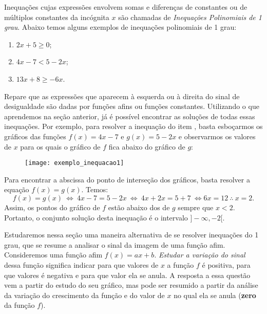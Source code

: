 \label{\detokenize{AF107-7:inequacoes-grau1}}\label{\detokenize{AF107-7::doc}}

Inequações cujas expressões envolvem somas e diferenças de constantes ou de múltiplos constantes da incógnita $x$ são chamadas de \emph{Inequações Polinomiais de 1 grau}. Abaixo temos alguns exemplos de inequações polinomiais de 1 grau:

\begin{enumerate}
\item{}
$2x + 5 \geq 0$;

\item{}
$4x - 7 < 5 - 2x$;

\item{}
$13x + 8 \geq -6x$.
\end{enumerate}

Repare que as expressões que aparecem à esquerda ou à direita do sinal de desigualdade são dadas por funções afins ou funções constantes. Utilizando o que aprendemos na seção anterior, já é possível encontrar as soluções de todas essas inequações. Por exemplo, para resolver a inequação do item , basta esboçarmos os gráficos das funções $f(x) = 4x -7$ e $g(x) = 5 - 2x$ e observarmos os valores de $x$ para os quais o gráfico de $f$ fica abaixo do gráfico de $g$:

\begin{figure}[H]
\centering
\noindent\texttt{[image: exemplo\_inequacao1]}
\end{figure}

Para encontrar a abscissa do ponto de interseção dos gráficos, basta resolver a equação $f(x) = g(x)$. Temos:
$$
f(x) = g(x) \ \iff \ 4x - 7 = 5 - 2x \ \iff \ 4x +2x = 5 +7 \ \iff 6x = 12 \ \therefore \ x = 2.
$$
Assim, os pontos do gráfico de $f$ estão abaixo dos de $g$ sempre que $x<2$. Portanto, o conjunto solução desta inequação é o intervalo $]-\infty, -2[$.

Estudaremos nessa seção uma maneira alternativa de se resolver inequações do 1 grau, que se resume a analisar o sinal da imagem de uma função afim. Consideremos uma função afim $f(x) = ax + b$. \emph{Estudar a variação do sinal} dessa função significa indicar para que valores de $x$ a função $f$ é positiva, para que valores é negativa e para que valor ela se anula. A resposta a essa questão vem a partir do estudo do seu gráfico, mas pode ser resumido a partir da análise da variação do crescimento da função e do valor de $x$ no qual ela se anula (\textbf{zero} da função $f$).

